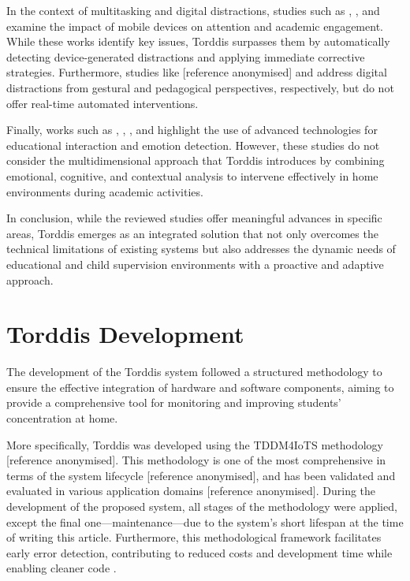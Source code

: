 			In the context of multitasking and digital distractions, studies such as \cite{Hartley2022Smartphone}, \cite{Labar2019Interplay}, and \cite{Farsani2020} examine the impact of mobile devices on attention and academic engagement. While these works identify key issues, Torddis surpasses them by automatically detecting device-generated distractions and applying immediate corrective strategies. Furthermore, studies like [reference anonymised] and \cite{Wang2022Empowering} address digital distractions from gestural and pedagogical perspectives, respectively, but do not offer real-time automated interventions.
			
			Finally, works such as \cite{Kulkarni2023}, \cite{Enadula2021}, \cite{Ozdamli2022}, and \cite{Warren2015Brief} highlight the use of advanced technologies for educational interaction and emotion detection. However, these studies do not consider the multidimensional approach that Torddis introduces by combining emotional, cognitive, and contextual analysis to intervene effectively in home environments during academic activities.
			
			In conclusion, while the reviewed studies offer meaningful advances in specific areas, Torddis emerges as an integrated solution that not only overcomes the technical limitations of existing systems but also addresses the dynamic needs of educational and child supervision environments with a proactive and adaptive approach.
	
	\section{Torddis Development}
	\label{section:fourth}
		The development of the Torddis system followed a structured methodology to ensure the effective integration of hardware and software components, aiming to provide a comprehensive tool for monitoring and improving students’ concentration at home.
		
		More specifically, Torddis was developed using the TDDM4IoTS methodology [reference anonymised]. This methodology is one of the most comprehensive in terms of the system lifecycle [reference anonymised], and has been validated and evaluated in various application domains  [reference anonymised]. During the development of the proposed system, all stages of the methodology were applied, except the final one—maintenance—due to the system’s short lifespan at the time of writing this article. Furthermore, this methodological framework facilitates early error detection, contributing to reduced costs and development time while enabling cleaner code \citep{Beck2002TDD}.
		
